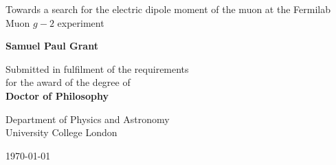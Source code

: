 \begin{titlepage}

\begin{center}
	\vspace*{0cm} { 

		\vspace{2cm} {
			\Huge {Towards a search for the electric dipole moment of the muon at the Fermilab Muon \lowercase{$g-2$} experiment}\\
		}

		\vspace{3cm} {
			\Large \textbf {Samuel Paul Grant}\\

		}

		\vspace{2cm} {
			\large{Submitted in fulfilment of the requirements\\ for the award of the degree of\\
			\textbf{Doctor of Philosophy}}\\
		}

		\vspace{2cm}

		 \large{ 
		 	Department of Physics and Astronomy \\ University College London 
		 	}

		\vspace{2cm}

		{	
		\large \today
		}
	}
\end{center}
\end{titlepage}